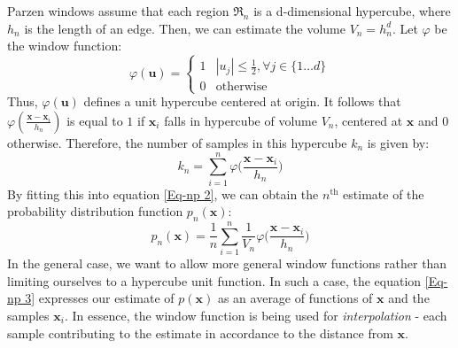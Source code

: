 Parzen windows assume that each region $\mathfrak{R}_n$ is a d-dimensional hypercube, where $h_n$ is the length of an edge. Then, we can estimate the volume $V_n = h_n^d$. Let $\varphi$ be the window function:
\begin{equation}
\varphi(\mathbf{u}) = \begin{cases}
1 & |u_j| \leq \frac{1}{2}, \forall j \in \{1\dots d\} \\
0 & \text{otherwise}
\end{cases}
\end{equation}
Thus, $\varphi(\mathbf{u})$ defines a unit hypercube centered at origin. It follows that $\varphi(\frac{\mathbf{x} - \mathbf{x}_i}{h_n})$ is equal to $1$ if $\mathbf{x}_i$ falls in hypercube of volume $V_n$, centered at $\mathbf{x}$ and $0$ otherwise. Therefore, the number of samples in this hypercube $k_n$ is given by:
\begin{equation}
k_n = \sum_{i=1}^{n} \varphi \bigg(\frac{\mathbf{x} - \mathbf{x}_i}{h_n}\bigg)
\end{equation}
By fitting this into equation \ref{Eq-np 2}, we can obtain the $n^{\text{th}}$ estimate of the probability distribution function $p_n(\mathbf{x})$: 
\begin{equation}
p_n(\mathbf{x}) = \frac{1}{n} \sum_{i=1}^{n} \frac{1}{V_n} \varphi \bigg( \frac{\mathbf{x} - \mathbf{x}_i}{h_n} \bigg)
\label{Eq-np 3}
\end{equation} 
In the general case, we want to allow more general window functions rather than limiting ourselves to a hypercube unit function. In such a case, the equation \ref{Eq-np 3} expresses our estimate of $p(\mathbf{x})$ as an average of functions of $\mathbf{x}$ and the samples $\mathbf{x}_i$. In essence, the window function is being used for \textit{interpolation} - each sample contributing to the estimate in accordance to the distance from $\mathbf{x}$.